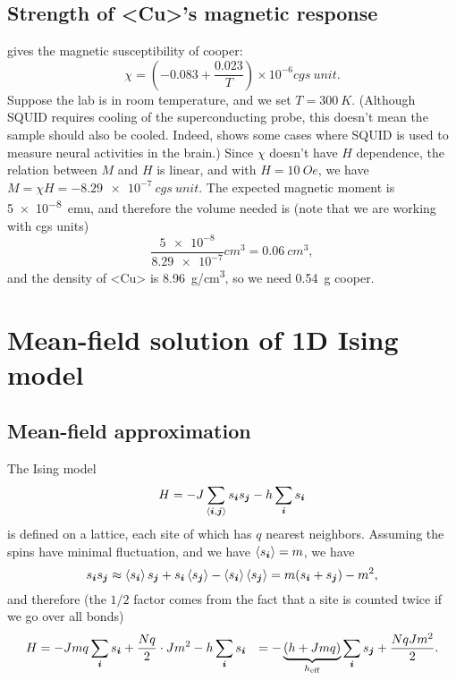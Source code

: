 \documentclass[hyperref, a4paper]{article}
\newcommand*{\pair}[1]{\langle #1 \rangle}
\def\\{}%
\def\ce#1{<#1>}%
\begin{document}
\subsection{Strength of \ce{Cu}'s magnetic response}

\cite{cooper_magnetic} gives the magnetic susceptibility of cooper:
\begin{equation}
    \chi=\left(-0.083+\frac{0.023}{T}\right) \times 10^{-6} \unit{cgs\ unit}.
\end{equation}
Suppose the lab is in room temperature, 
and we set $T = \SI{300}{K}$.
(Although SQUID requires cooling of the superconducting probe, 
this doesn't mean the sample should also be cooled. 
Indeed, \cite{singh2014magnetoencephalography} shows 
some cases where SQUID is used to measure 
neural activities in the brain.)
Since $\chi$ doesn't have $H$ dependence,
the relation between $M$ and $H$ is linear,
and with $H = \SI{10}{Oe}$,
we have $M = \chi H = \SI{-8.29e-7}{cgs\ unit}$.
The expected magnetic moment is \SI{5e-8}{emu}, 
and therefore the volume needed is (note that we are working with cgs units)
\[
    \frac{\num{5e-8}}{\num{8.29e-7}} \unit{cm^3} = \SI{0.06}{cm^3},
\]
and the density of \ce{Cu} is \SI{8.96}{g/cm^3},
so we need \SI{0.54}{g} cooper.

\section{Mean-field solution of 1D Ising model}

\subsection{Mean-field approximation}

The Ising model 
\begin{equation}
    H = - J \sum_{\pair{\vb*{i}, \vb*{j}}} s_{\vb*{i}} s_{\vb*{j}} - h \sum_{\vb*{i}} s_{\vb*{i}}
\end{equation}
is defined on a lattice,
each site of which has $q$ nearest neighbors.
Assuming the spins have minimal fluctuation, 
and we have $\expval{s_{\vb*{i}}} = m$, 
we have 
\[
    s_{\vb*{i}} s_{\vb*{j}} \approx 
    \expval{s_{\vb*{i}}} s_{\vb*{j}} + s_{\vb*{i}} \expval{s_{\vb*{j}}} 
    - \expval{s_{\vb*{i}}} \expval{s_{\vb*{j}}} = 
    m (s_{\vb*{i}} + s_{\vb*{j}}) - m^2,
\]
and therefore (the $1/2$ factor comes from the fact that a site is counted twice 
if we go over all bonds)
\begin{equation}
    \begin{aligned}
        H &= - J m q \sum_{\vb*{i}} s_{\vb*{i}} 
        + \frac{N q}{2} \cdot J m^2 - h \sum_{\vb*{i}} s_{\vb*{i}} \\
        &= - \underbrace{(h + Jmq)}_{h_{\text{eff}}} \sum_{\vb*{i}} s_{\vb*{j}} 
        + \frac{NqJm^2}{2} .
    \end{aligned}
\end{equation}
\end{document}
